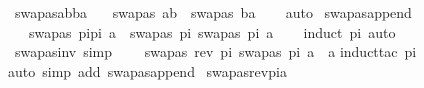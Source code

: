 \begin{isabellebody}
\ swapas{\isacharunderscore}{\kern0pt}ab{\isacharunderscore}{\kern0pt}ba{\isacharcolon}{\kern0pt}\isanewline
\ \ \ {\isachardoublequoteopen}swapas\ {\isacharbrackleft}{\kern0pt}{\isacharparenleft}{\kern0pt}a{\isacharcomma}{\kern0pt}b{\isacharparenright}{\kern0pt}{\isacharbrackright}{\kern0pt}\ {\isacharequal}{\kern0pt}\ swapas\ {\isacharbrackleft}{\kern0pt}{\isacharparenleft}{\kern0pt}b{\isacharcomma}{\kern0pt}a{\isacharparenright}{\kern0pt}{\isacharbrackright}{\kern0pt}{\isachardoublequoteclose}\isanewline
%
\isadelimproof
\ \ %
\endisadelimproof
%
\isatagproof
{}\isamarkupfalse%
\ auto%
\endisatagproof
{\isafoldproof}%
%
\isadelimproof
\isanewline
%
\endisadelimproof
\isanewline
{}\isamarkupfalse%
\ swapas{\isacharunderscore}{\kern0pt}append{\isacharcolon}{\kern0pt}\ \isanewline
\ \ \ {\isachardoublequoteopen}swapas\ {\isacharparenleft}{\kern0pt}pi{}{\isacharat}{\kern0pt}pi{}{\isacharparenright}{\kern0pt}\ a\ {\isacharequal}{\kern0pt}\ swapas\ pi{}\ {\isacharparenleft}{\kern0pt}swapas\ pi{}\ a{\isacharparenright}{\kern0pt}{\isachardoublequoteclose}\isanewline
%
\isadelimproof
\ \ %
\endisadelimproof
%
\isatagproof
{}\isamarkupfalse%
\ {\isacharparenleft}{\kern0pt}induct\ pi{}{\isacharparenright}{\kern0pt}\ auto%
\endisatagproof
{\isafoldproof}%
%
\isadelimproof
\isanewline
%
\endisadelimproof
\ \isanewline
{}\isamarkupfalse%
\ swapas{\isacharunderscore}{\kern0pt}inv\ {\isacharbrackleft}{\kern0pt}simp{\isacharbrackright}{\kern0pt}{\isacharcolon}{\kern0pt}\ \isanewline
\ \ \ {\isachardoublequoteopen}swapas\ {\isacharparenleft}{\kern0pt}rev\ pi{\isacharparenright}{\kern0pt}\ {\isacharparenleft}{\kern0pt}swapas\ pi\ a{\isacharparenright}{\kern0pt}\ {\isacharequal}{\kern0pt}\ a{\isachardoublequoteclose}\isanewline
%
\isadelimproof
%
\endisadelimproof
%
\isatagproof
{}\isamarkupfalse%
{\isacharparenleft}{\kern0pt}induct{\isacharunderscore}{\kern0pt}tac\ pi{\isacharparenright}{\kern0pt}\isanewline
{}\isamarkupfalse%
{\isacharparenleft}{\kern0pt}auto\ simp\ add{\isacharcolon}{\kern0pt}\ swapas{\isacharunderscore}{\kern0pt}append{\isacharparenright}{\kern0pt}\isanewline
{}\isamarkupfalse%
%
\endisatagproof
{\isafoldproof}%
%
\isadelimproof
\isanewline
%
\endisadelimproof
\isanewline
{}\isamarkupfalse%
\ swapas{\isacharunderscore}{\kern0pt}rev{\isacharunderscore}{\kern0pt}pi{\isacharunderscore}{\kern0pt}a{\isacharcolon}{\kern0pt}\ \isanewline

\end{isabellebody}

